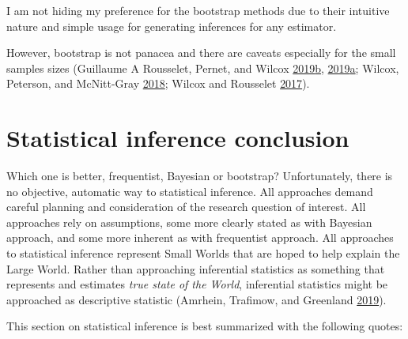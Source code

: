\documentclass[
]{book}
\begin{document}
I am not hiding my preference for the bootstrap methods due to their intuitive nature and simple usage for generating inferences for any estimator.

However, bootstrap is not panacea and there are caveats especially for the small samples sizes (Guillaume A Rousselet, Pernet, and Wilcox \protect\hyperlink{ref-rousseletPercentileBootstrapTeaser2019}{2019}\protect\hyperlink{ref-rousseletPercentileBootstrapTeaser2019}{b}, \protect\hyperlink{ref-rousseletPracticalIntroductionBootstrap2019}{2019}\protect\hyperlink{ref-rousseletPracticalIntroductionBootstrap2019}{a}; Wilcox, Peterson, and McNitt-Gray \protect\hyperlink{ref-wilcoxDataAnalysesWhen2018}{2018}; Wilcox and Rousselet \protect\hyperlink{ref-wilcoxGuideRobustStatistical2017}{2017}).

\hypertarget{statistical-inference-conclusion}{%
\chapter{Statistical inference conclusion}\label{statistical-inference-conclusion}}

Which one is better, frequentist, Bayesian or bootstrap? Unfortunately, there is no objective, automatic way to statistical inference. All approaches demand careful planning and consideration of the research question of interest. All approaches rely on assumptions, some more clearly stated as with Bayesian approach, and some more inherent as with frequentist approach. All approaches to statistical inference represent Small Worlds that are hoped to help explain the Large World. Rather than approaching inferential statistics as something that represents and estimates \emph{true state of the World}, inferential statistics might be approached as descriptive statistic (Amrhein, Trafimow, and Greenland \protect\hyperlink{ref-amrheinInferentialStatisticsDescriptive2019}{2019}).

This section on statistical inference is best summarized with the following quotes:
\end{document}
